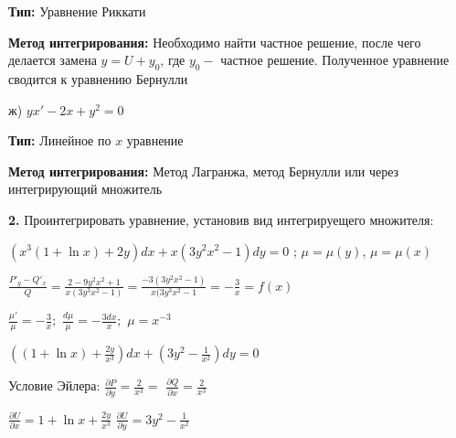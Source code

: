 \documentclass[a4paper]{article}
\begin{document}
\vspace{0.3cm}

\textbf{Тип: } Уравнение Риккати

\textbf{Метод интегрирования: } Необходимо найти частное решение, после чего делается замена $\displaystyle y = U+y_0$, где $y_0-$ частное решение. Полученное уравнение сводится к уравнению Бернулли

\vspace{1cm}

ж) $\displaystyle yx'-2x+y^2=0$

\vspace{0.3cm}

\textbf{Тип: } Линейное по $x$ уравнение

\textbf{Метод интегрирования: } Метод Лагранжа, метод Бернулли или через интегрирующий множитель

\vspace{1cm}

\textbf{2.} Проинтегрировать уравнение, установив вид интегрируещего множителя:

\vspace{0.3cm}

$\displaystyle(x^3(1+\ln{x})+2y)dx+x(3y^2x^2-1)dy=0$ ; $\mu=\mu(y)$, $\mu=\mu(x)$

\vspace{0.3cm}

$\displaystyle \frac{P'_y-Q'_x}{Q}=\frac{2-9y^2x^2+1}{x(3y^3x^2-1)}=\frac{-3(3y^2x^2-1)}{x(3y^3x^2-1}=-\frac{3}{x}=f(x)$

\vspace{0.3cm}

$\displaystyle \frac{\mu'}{\mu}=-\frac{3}{x};$ \hspace{0.7cm} $\displaystyle \frac{d\mu}{\mu}=-\frac{3dx}{x};$ \hspace{0.7cm} $\displaystyle \mu=x^{-3}$

\vspace{0.3cm}

$\displaystyle ((1+\ln{x})+\frac{2y}{x^3})dx+(3y^2-\frac{1}{x^2})dy=0$

\vspace{0.3cm}

Условие Эйлера: $\displaystyle \frac{\partial P}{\partial y} = \frac{2}{x^3}  =$ $\displaystyle \frac{\partial Q}{\partial x} = \frac{2}{x^3}$

\vspace{0.3cm}

$\displaystyle \frac{\partial U}{\partial x} = 1+\ln{x}+\frac{2y}{x^3} $ \hspace{0.7cm} $\displaystyle \frac{\partial U}{\partial y} = 3y^2-\frac{1}{x^2}$
\end{document}
